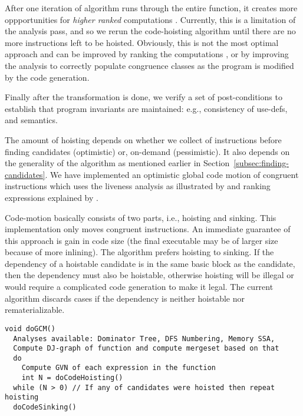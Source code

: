 \documentclass[acmlarge,review,anonymous]{acmart}\settopmatter{printfolios=true}
\begin{document}
After one iteration of algorithm runs through the entire function, it creates
more oppportunities for \emph{higher ranked} computations
\cite{rosen1988global}. Currently, this is a limitation of the \GVN{} analysis
pass, and so we rerun the code-hoisting algorithm until there are no more
instructions left to be hoisted.  Obviously, this is not the most optimal
approach and can be improved by ranking the computations \cite{rosen1988global},
or by improving the \GVN{} analysis to correctly populate congruence classes as
the program is modified by the code generation.

Finally after the transformation is done, we verify a set of post-conditions to
establish that program invariants are maintained: e.g., consistency of use-defs,
and \SSA{} semantics.

The amount of hoisting depends on whether we collect \GVN{} of instructions
before finding candidates (optimistic) or, on-demand (pessimistic). It also
depends on the generality of the \GVN{} algorithm as mentioned earlier in
Section~\ref{subsec:finding-candidates}. We have implemented an optimistic
global code motion of congruent instructions which uses the liveness analysis as
illustrated by \citet{das2012} and ranking expressions explained by
\citet{rosen1988global}.

Code-motion basically consists of two parts, i.e., hoisting and sinking. This
implementation only moves congruent instructions. An immediate guarantee of this
approach is gain in code size (the final executable may be of larger size
because of more inlining). The algorithm prefers hoisting to sinking. If the
dependency of a hoistable candidate is in the same basic block as the candidate,
then the dependency must also be hoistable, otherwise hoisting will be illegal or
would require a complicated code generation to make it legal. The current
algorithm discards cases if the dependency is neither hoistable nor
rematerializable.

\begin{verbatim}
void doGCM()
  Analyses available: Dominator Tree, DFS Numbering, Memory SSA,
  Compute DJ-graph of function and compute mergeset based on that
  do
    Compute GVN of each expression in the function
    int N = doCodeHoisting()
  while (N > 0) // If any of candidates were hoisted then repeat hoisting
  doCodeSinking()
\end{verbatim}
\end{document}

